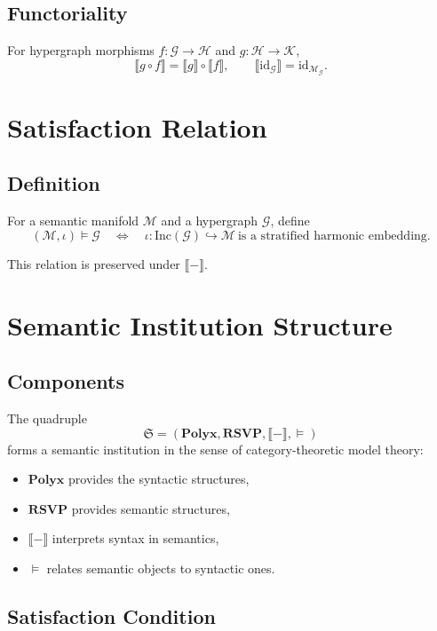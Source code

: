 \subsection{Functoriality}

For hypergraph morphisms $f:\mathcal{G}\to\mathcal{H}$ and $g:\mathcal{H}\to\mathcal{K}$,
\[
\llbracket g\circ f \rrbracket
=
\llbracket g \rrbracket \circ \llbracket f \rrbracket,
\qquad
\llbracket \mathrm{id}_{\mathcal{G}} \rrbracket
=
\mathrm{id}_{\mathcal{M}_{\mathcal{G}}}.
\]

\section{Satisfaction Relation}

\subsection{Definition}

For a semantic manifold $\mathcal{M}$ and a hypergraph $\mathcal{G}$, define
\[
(\mathcal{M},\iota) \models \mathcal{G}
\quad\Longleftrightarrow\quad
\iota : \mathrm{Inc}(\mathcal{G}) \hookrightarrow \mathcal{M}
\ \text{is a stratified harmonic embedding}.
\]

This relation is preserved under $\llbracket - \rrbracket$.

\section{Semantic Institution Structure}

\subsection{Components}

The quadruple
\[
\mathfrak{S}
=
(\mathbf{Polyx},\mathbf{RSVP},\llbracket - \rrbracket,\models)
\]
forms a semantic institution in the sense of category-theoretic model theory:
\begin{itemize}
\item $\mathbf{Polyx}$ provides the syntactic structures,
\item $\mathbf{RSVP}$ provides semantic structures,
\item $\llbracket - \rrbracket$ interprets syntax in semantics,
\item $\models$ relates semantic objects to syntactic ones.
\end{itemize}

\subsection{Satisfaction Condition}

